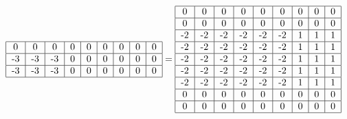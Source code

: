 \documentclass{article}
\begin{document}
\begin{equation}
\begin{tabular}{ | c | c | c | c | c | c | c | c | c | }
        \hline
        0 & 0 & 0 & 0 & 0 & 0 & 0 & 0 & 0 \\ 
        \hline
        -3 & -3 & -3 & 0 & 0 & 0 & 0 & 0 & 0 \\ 
        \hline
        -3 & -3 & -3 & 0 & 0 & 0 & 0 & 0 & 0 \\ 
        \hline
    \end{tabular} = 
    \begin{tabular}{ | c | c | c | c | c | c | c | c | c | }
        \hline
        0 & 0 & 0 & 0 & 0 & 0 & 0 & 0 & 0 \\ 
        \hline
        0 & 0 & 0 & 0 & 0 & 0 & 0 & 0 & 0 \\ 
        \hline
        -2 & -2 & -2 & -2 & -2 & -2 & 1 & 1 & 1 \\ 
        \hline
        -2 & -2 & -2 & -2 & -2 & -2 & 1 & 1 & 1 \\ 
        \hline
        -2 & -2 & -2 & -2 & -2 & -2 & 1 & 1 & 1 \\ 
        \hline
        -2 & -2 & -2 & -2 & -2 & -2 & 1 & 1 & 1 \\ 
        \hline
        -2 & -2 & -2 & -2 & -2 & -2 & 1 & 1 & 1 \\ 
        \hline
        0 & 0 & 0 & 0 & 0 & 0 & 0 & 0 & 0 \\ 
        \hline
        0 & 0 & 0 & 0 & 0 & 0 & 0 & 0 & 0 \\ 
        \hline
    \end{tabular}
\end{equation}
\end{document}
